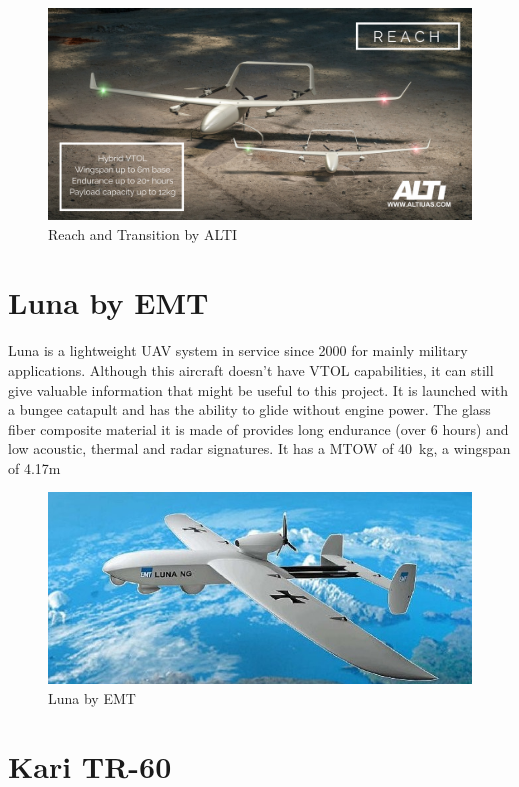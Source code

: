 \documentclass[english,fira]{ist-report}
\begin{document}
\begin{figure}[ht]
    \centering
    \includegraphics[width = 0.7\linewidth]{graphics/MarketOverview/reach.png}
    \caption{Reach and Transition by ALTI}
    \label{fig:reach}
\end{figure}


\section{Luna by EMT}

Luna is a lightweight UAV system in service since 2000 for mainly military applications.\cite{luna} Although this aircraft doesn't have VTOL capabilities, it can still give valuable information that might be useful to this project. It is launched with a bungee catapult and has the ability to glide without engine power. The glass fiber composite material it is made of provides long endurance (over 6 hours) and low acoustic, thermal and radar signatures. It has a MTOW of \SI{40}{\kilo\gram}, a wingspan of 4.17m 

\begin{figure}[ht]
    \centering
    \includegraphics[width = 0.7\linewidth]{graphics/MarketOverview/Luna.jpg}
    \caption{Luna by EMT}
    \label{fig:luna}
\end{figure}

\section{Kari TR-60}
\end{document}
